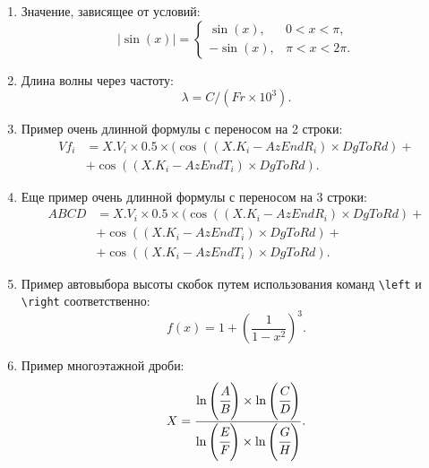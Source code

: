 \begin{enumerate}
\item Значение, зависящее от условий:
{%
	\begin{equation}	
	|\sin(x)|=
	\begin{cases}
	\sin(x), & 0<x<\pi, \\
	-\sin(x), & \pi<x<2\pi.	
	\end{cases}
	\label{eq:ф13}
	\end{equation}
}
\item Длина волны через частоту:
{\zerodisplayskips
	\begin{equation}	
	\lambda=C/(Fr \times 10^3).
	\end{equation}
}
\item Пример очень длинной формулы с переносом на 2 строки:
{%
	\begin{equation}
	\begin{split}	
	Vf_i&=X.V_i\times 0.5 \times (\cos((X.K_i - AzEndR_i)\times DgToRd) +{}\\
	    &+\cos((X.K_i - AzEndT_i)\times DgToRd).
	\label{eq:ф14}
	\end{split}
	\end{equation}
}
\item Еще пример очень длинной формулы с переносом на 3 строки:
{%
	\begin{equation}
	\begin{split}	
	ABCD&=X.V_i\times 0.5 \times (\cos((X.K_i - AzEndR_i)\times DgToRd) +{}\\
	&+\cos((X.K_i - AzEndT_i)\times DgToRd)+{}\\
	&+\cos((X.K_i - AzEndT_i)\times DgToRd).  
	\label{eq:ф15}
	\end{split}
	\end{equation}
}
\item Пример автовыбора высоты скобок путем использования команд \verb=\left= и \verb=\right= соответственно:
{
	\begin{equation}
	f(x)=1+\left(\frac{1}{1-x^{2}}
	\right)^3.
	\end{equation}
}
\item Пример многоэтажной дроби:
{%
	\begin{equation}
	X=\frac{\ln\left(\cfrac{A}{B}\right)\times \ln\left(\cfrac{C}{D}\right)}{\ln\left(\cfrac{E}{F} \right)\times \ln\left(\cfrac{G}{H} \right)}.
	\end{equation}
}
\end{enumerate}	


